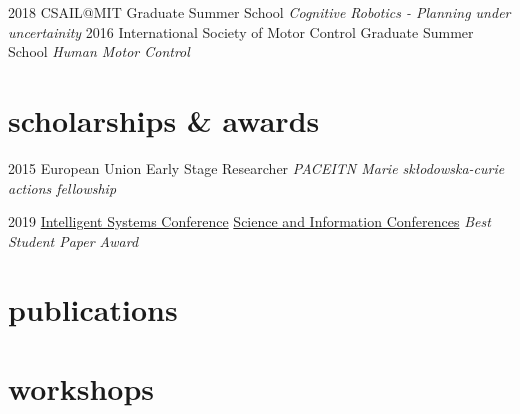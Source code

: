 \documentclass[]{friggeri-cv}
\begin{document}
\begin{entrylist}
  \entry
    {2018}
    {CSAIL@MIT}
    {Graduate Summer School}
    {\emph{Cognitive Robotics - Planning under uncertainity}}
  \entry
    {2016}
    {International Society of Motor Control}
    {Graduate Summer School}
    {\emph{Human Motor Control}}
\end{entrylist}

\vspace{-0.35cm}

\section{scholarships \& awards}

\begin{entrylist}
  \entry
    {2015}
    {European Union}
    {Early Stage Researcher}
    {\emph{PACE\footnotemark ITN Marie skłodowska-curie actions fellowship}}
    
 \entry
    {2019}
    {\href{https://saiconference.com/IntelliSys}{Intelligent Systems Conference}}
    {\href{https://saiconference.com/Conferences}{Science and Information Conferences}}
    {\emph{Best Student Paper Award \cite{tirupachuri2019towards}}}
\end{entrylist}



\vspace{-0.35cm}

\newpage

\section{publications}

\begin{refsection}
   \nocite{*}   
   \printbibliography[heading=none]
\end{refsection}


\section{workshops}


\begin{refsection}
   \nocite{*}   
   \printbibliography[heading=none]
\end{refsection}
\end{document}
